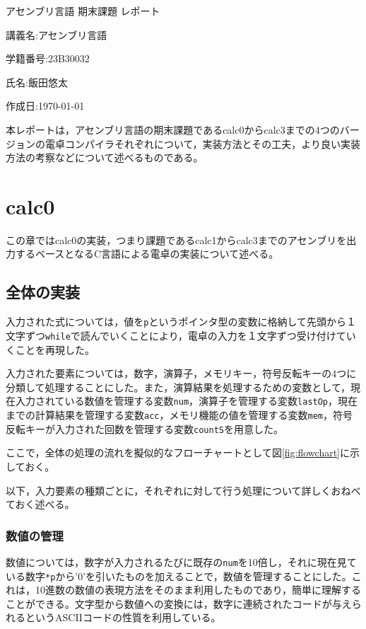 \documentclass[a4paper]{jsarticle}
\newcommand{\var}[1]{\texttt{#1}}
\begin{document}
\begin{titlepage}
\begin{center}
\vspace*{150truept}
{\huge アセンブリ言語 期末課題 レポート}\par
\vspace{50truept}
{\large 講義名:アセンブリ言語}\par
\vspace{5truept}
{\large 学籍番号:23B30032}\par
\vspace{5truept}
{\large 氏名:飯田悠太}\par
\vspace{5truept}
{\large 作成日:\today}
\end{center}
\end{titlepage}
本レポートは，アセンブリ言語の期末課題であるcalc0からcalc3までの4つのバージョンの電卓コンパイラそれぞれについて，実装方法とその工夫，より良い実装方法の考察などについて述べるものである。
\section{calc0}
この章ではcalc0の実装，つまり課題であるcalc1からcalc3までのアセンブリを出力するベースとなるC言語による電卓の実装について述べる。
\subsection{全体の実装}
入力された式については，値を\var{p}というポインタ型の変数に格納して先頭から１文字ずつ\var{while}で読んでいくことにより，電卓の入力を１文字ずつ受け付けていくことを再現した。

入力された要素については，数字，演算子，メモリキー，符号反転キーの4つに分類して処理することにした。また，演算結果を処理するための変数として，現在入力されている数値を管理する変数\var{num}，演算子を管理する変数\var{lastOp}，現在までの計算結果を管理する変数\var{acc}，メモリ機能の値を管理する変数\var{mem}，符号反転キーが入力された回数を管理する変数\var{countS}を用意した。

ここで，全体の処理の流れを擬似的なフローチャートとして図\ref{fig:flowchart}に示しておく。

以下，入力要素の種類ごとに，それぞれに対して行う処理について詳しくおねべておく述べる。
\subsubsection{数値の管理}
数値については，数字が入力されるたびに既存の\var{num}を10倍し，それに現在見ている数字\var{*p}から'0'を引いたものを加えることで，数値を管理することにした。これは，10進数の数値の表現方法をそのまま利用したものであり，簡単に理解することができる。文字型から数値への変換には，数字に連続されたコードが与えられるというASCIIコードの性質を利用している。
\end{document}
